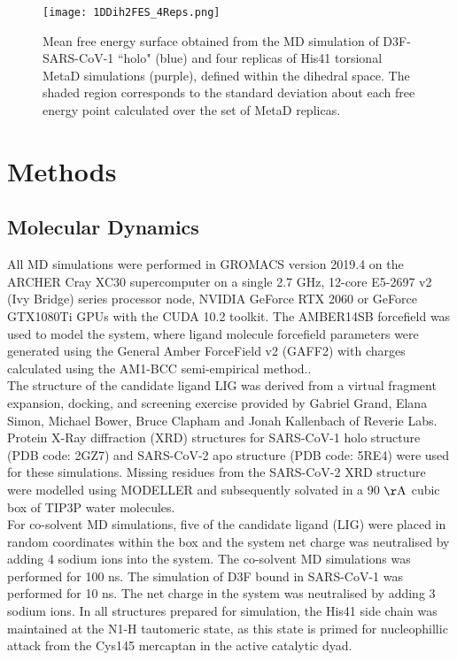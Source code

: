 \begin{figure}[!h]
    \centering
    \texttt{[image: 1DDih2FES\_4Reps.png]}
    \caption{Mean free energy surface obtained from the MD simulation of D3F-SARS-CoV-1 ``holo" (blue) and four replicas of His41 torsional MetaD simulations (purple), defined within the \dihtwo dihedral space. The shaded region corresponds to the standard deviation about each free energy point calculated over the set of MetaD replicas.}
    \label{fig:1DPMFAll_Dihtwo}
\end{figure}
%
%
%
%
%
%
%
\section{Methods}

\subsection{Molecular Dynamics}
All MD simulations were performed in GROMACS version 2019.4 on the ARCHER Cray XC30 supercomputer on a single 2.7 GHz, 12-core E5-2697 v2 (Ivy Bridge) series processor node, NVIDIA GeForce RTX 2060 or GeForce GTX1080Ti GPUs with the CUDA 10.2 toolkit.  The AMBER14SB forcefield \cite{amberff14SB} was used to model the system, where ligand molecule forcefield parameters were generated using the General Amber ForceField v2 (GAFF2) with charges calculated using the AM1-BCC semi-empirical method.\cite{amber16}.\\

The structure of the candidate ligand LIG was derived from a virtual fragment expansion, docking, and screening exercise provided by Gabriel Grand, Elana Simon, Michael Bower, Bruce Clapham and Jonah Kallenbach of Reverie Labs.\cite{gabereverie} Protein X-Ray diffraction (XRD) structures for SARS-CoV-1 \mpro holo structure (PDB code: 2GZ7) \cite{2gz7} and SARS-CoV-2 \mpro apo structure (PDB code: 5RE4) were used for these simulations. Missing residues from the SARS-CoV-2 XRD structure were modelled using MODELLER \cite{modeller} and subsequently solvated in a 90 $\rm{\AA}$ cubic box of TIP3P water molecules. \\

For co-solvent MD simulations, five of the candidate ligand (LIG) were placed in random coordinates within the box and the system net charge was neutralised by adding 4 sodium ions into the system. The co-solvent MD simulations was performed for 100 ns. The simulation of D3F bound in SARS-CoV-1 \mpro was performed for 10 ns. The net charge in the system was neutralised by adding 3 sodium ions. In all structures prepared for simulation, the His41 side chain was maintained at the N1-H tautomeric state, as this state is primed for nucleophillic attack from the Cys145 mercaptan in the active catalytic dyad.\\

